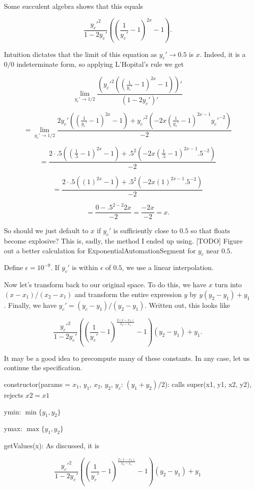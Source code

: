 \documentclass{article}
\begin{document}
{Some succulent algebra shows that this equals

$$\frac{y_c'^2}{1-2y_c'}\left(\left(\frac{1}{y_c'}-1\right)^{2x}-1\right).$$

Intuition dictates that the limit of this equation as $y_c'\to 0.5$ is $x$. Indeed, it is a $0/0$ indeterminate form, so applying L'Hopital's rule we get

$$\lim_{y_c'\to 1/2}\frac{\left(y_c'^2\left(\left(\frac{1}{y_c'}-1\right)^{2x}-1\right)\right)'}{\left(1-2y_c'\right)'}$$

$$=\lim_{y_c'\to 1/2}\frac{2y_c'\left(\left(\frac{1}{y_c'}-1\right)^{2x}-1\right)+y_c'^2\left(-2x\left(\frac{1}{y_c'}-1\right)^{2x-1}y_c'^{-2}\right)}{-2}$$

$$=\frac{2\cdot .5\left(\left(\frac{1}{.5}-1\right)^{2x}-1\right)+.5^2\left(-2x\left(\frac{1}{.5}-1\right)^{2x-1}.5^{-2}\right)}{-2}$$

$$=\frac{2\cdot .5\left(\left(1\right)^{2x}-1\right)+.5^2\left(-2x\left(1\right)^{2x-1}.5^{-2}\right)}{-2}$$

$$=\frac{0-.5^{2-2}2x}{-2}=\frac{-2x}{-2}=x.$$

So should we just default to $x$ if $y_c'$ is sufficiently close to $0.5$ so that floats become explosive? This is, sadly, the method I ended up using. [TODO] Figure out a better calculation for ExponentialAutomationSegment for $y_c$ near $0.5$.

Define $\epsilon=10^{-9}$. If $y_c'$ is within $\epsilon$ of $0.5$, we use a linear interpolation.

Now let's transform back to our original space. To do this, we have $x$ turn into $(x-x_1)/(x_2-x_1)$ and transform the entire expression $y$ by $y(y_2-y_1)+y_1$. Finally, we have $y_c'=(y_c-y_1)/(y_2-y_1)$. Written out, this looks like

$$\frac{y_c'^2}{1-2y_c'}\left(\left(\frac{1}{y_c'}-1\right)^{\frac{2(x-x_1)}{x_2-x_1}}-1\right)(y_2-y_1)+y_1.$$

It may be a good idea to precompute many of these constants. In any case, let us continue the specification.

constructor(params = {$x_1$, $y_1$, $x_2$, $y_2$, $y_c$: $(y_1+y_2) / 2$}): calls super(x1, y1, x2, y2), rejects $x2 = x1$

ymin: $\min\{y_1,y_2\}$

ymax: $\max\{y_1,y_2\}$

getValues(x): As discussed, it is

$$\frac{y_c'^2}{1-2y_c'}\left(\left(\frac{1}{y_c'}-1\right)^{\frac{2(x-x_1)}{x_2-x_1}}-1\right)(y_2-y_1)+y_1$$

}
\end{document}
